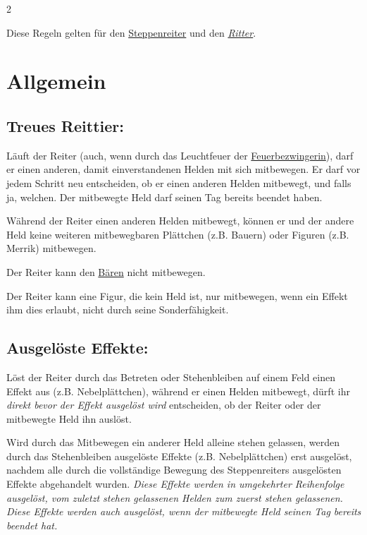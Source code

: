 \documentclass[10pt, a4paper, oneside]{book}
\newcommand{\fan}[1]{\textit{#1}}
\begin{document}
\begin{multicols*}{2}\raggedcolumns


\begin{nobgcolor}

Diese Regeln gelten für den \hyperref[steppenreiter]{Steppenreiter} und den \fan{\hyperref[ritter]{Ritter}}.


\section{Allgemein}

\subsection{Treues Reittier:}

Läuft der Reiter (auch, wenn durch das Leuchtfeuer der \hyperref[feuerbezwingerin]{Feuerbezwingerin}\supercite{127533}), darf er einen anderen, damit einverstandenen\supercite{48981} Helden mit sich mitbewegen. Er darf vor jedem Schritt neu entscheiden, ob er einen anderen Helden mitbewegt, und falls ja, welchen. 
Der mitbewegte Held darf seinen Tag bereits beendet haben.
\supercite{dfl-begleitheft}

Während der Reiter einen anderen Helden mitbewegt, können er und der andere Held keine weiteren mitbewegbaren Plättchen (z.B. Bauern) oder Figuren (z.B. Merrik) mitbewegen.
\supercite{40250,41284,45835}

Der Reiter kann den \hyperref[hautwandler]{Bären} nicht mitbewegen.
\supercite{dh-begleitheft}

Der Reiter kann eine Figur, die kein Held ist, nur mitbewegen, wenn ein Effekt ihm dies erlaubt, nicht durch seine Sonderfähigkeit.







\subsection{Ausgelöste Effekte:}

Löst der Reiter durch das Betreten oder Stehenbleiben auf einem Feld einen Effekt aus (z.B. Nebelplättchen), während er einen Helden mitbewegt, dürft ihr \fan{direkt bevor der Effekt ausgelöst wird} entscheiden, ob der Reiter oder der mitbewegte Held ihn auslöst.
\supercite{dfl-begleitheft}

Wird durch das Mitbewegen ein anderer Held alleine stehen gelassen, werden durch das Stehenbleiben ausgelöste Effekte (z.B. Nebelplättchen) erst ausgelöst, nachdem alle durch die vollständige Bewegung des Steppenreiters ausgelösten Effekte abgehandelt wurden.
\supercite{dlh-faq}
\fan{Diese Effekte werden in umgekehrter Reihenfolge ausgelöst, vom zuletzt stehen gelassenen Helden zum zuerst stehen gelassenen. Diese Effekte werden auch ausgelöst, wenn der mitbewegte Held seinen Tag bereits beendet hat.}





\end{nobgcolor}
\end{multicols*}
\end{document}
